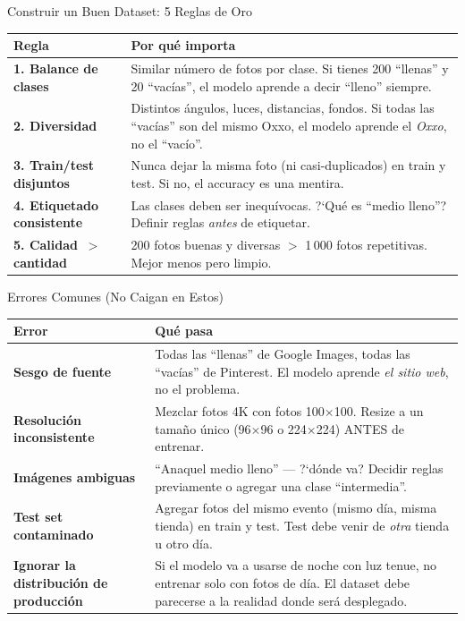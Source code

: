 \documentclass[aspectratio=169, 11pt]{beamer}
\begin{document}
\begin{frame}[shrink]{Construir un Buen Dataset: 5 Reglas de Oro}
  \vspace{6pt}
  {\footnotesize
  \begin{tabular}{@{}p{3.5cm} p{9.0cm}@{}}
    \toprule
    \textbf{Regla} & \textbf{Por qu\'e importa} \\
    \midrule
    \rowcolor{arcaGray}
    \textbf{1. Balance de clases}
    & Similar n\'umero de fotos por clase. Si tienes 200 ``llenas''
      y 20 ``vac\'ias'', el modelo aprende a decir ``lleno'' siempre. \\
    \textbf{2. Diversidad}
    & Distintos \'angulos, luces, distancias, fondos. Si todas las
      ``vac\'ias'' son del mismo Oxxo, el modelo aprende el \emph{Oxxo},
      no el ``vac\'io''. \\
    \rowcolor{arcaGray}
    \textbf{3. Train/test disjuntos}
    & Nunca dejar la misma foto (ni casi-duplicados) en train y test.
      Si no, el accuracy es una mentira. \\
    \textbf{4. Etiquetado consistente}
    & Las clases deben ser inequ\'ivocas. ?`Qu\'e es ``medio lleno''?
      Definir reglas \emph{antes} de etiquetar. \\
    \rowcolor{arcaGray}
    \textbf{5. Calidad $\,>\,$ cantidad}
    & 200 fotos buenas y diversas $>$ 1\,000 fotos repetitivas.
      Mejor menos pero limpio. \\
    \bottomrule
  \end{tabular}
  }
\end{frame}

\begin{frame}[shrink]{Errores Comunes (No Caigan en Estos)}
  \vspace{6pt}
  {\footnotesize
  \begin{tabular}{@{}p{4.5cm} p{8.0cm}@{}}
    \toprule
    \textbf{Error} & \textbf{Qu\'e pasa} \\
    \midrule
    \rowcolor{arcaRed!8}
    \textbf{Sesgo de fuente}
    & Todas las ``llenas'' de Google Images, todas las ``vac\'ias'' de
      Pinterest. El modelo aprende \emph{el sitio web}, no el problema. \\
    \textbf{Resoluci\'on inconsistente}
    & Mezclar fotos 4K con fotos 100$\times$100. Resize a un tama\~no
      \'unico (96$\times$96 o 224$\times$224) ANTES de entrenar. \\
    \rowcolor{arcaRed!8}
    \textbf{Im\'agenes ambiguas}
    & ``Anaquel medio lleno'' --- ?`d\'onde va? Decidir reglas
      previamente o agregar una clase ``intermedia''. \\
    \textbf{Test set contaminado}
    & Agregar fotos del mismo evento (mismo d\'ia, misma tienda) en
      train y test. Test debe venir de \emph{otra} tienda u otro d\'ia. \\
    \rowcolor{arcaRed!8}
    \textbf{Ignorar la distribuci\'on de producci\'on}
    & Si el modelo va a usarse de noche con luz tenue, no entrenar
      solo con fotos de d\'ia. El dataset debe parecerse a la realidad
      donde ser\'a desplegado. \\
    \bottomrule
  \end{tabular}
  }
\end{frame}
\end{document}
